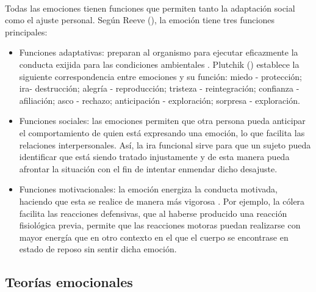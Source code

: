 \paragraph{}
Todas las emociones tienen funciones que permiten tanto la adaptación social como el ajuste personal. Según Reeve (\citeyear{reeve1994motivacion}), la emoción tiene tres funciones principales:
\begin{itemize}
    \item Funciones adaptativas: preparan al organismo para ejecutar eficazmente la conducta exijida para las condiciones ambientales \citep{montanes2005psicologia}. Plutchik (\citeyear{plutchik1980emotion}) establece la siguiente correspondencia entre emociones y su función: miedo - protección; ira- destrucción; alegría - reproducción; tristeza - reintegración; confianza - afiliación; asco - rechazo; anticipación - exploración; sorpresa - exploración. 
    
    \item Funciones sociales: las emociones permiten que otra persona pueda anticipar el comportamiento de quien está expresando una emoción, lo que facilita las relaciones interpersonales. Así, la ira funcional sirve para que un sujeto pueda identificar que está siendo tratado injustamente y de esta manera pueda afrontar la situación con el fin de intentar enmendar dicho desajuste.
    
    \item Funciones motivacionales: la emoción energiza la conducta motivada, haciendo que esta se realice de manera más vigorosa \citep{montanes2005psicologia}. Por ejemplo, la cólera facilita las reacciones defensivas, que al haberse producido una reacción fisiológica previa, permite que las reacciones motoras puedan realizarse con mayor energía que en otro contexto en el que el cuerpo se encontrase en estado de reposo sin sentir dicha emoción.
\end{itemize}


\subsection{Teorías emocionales}

